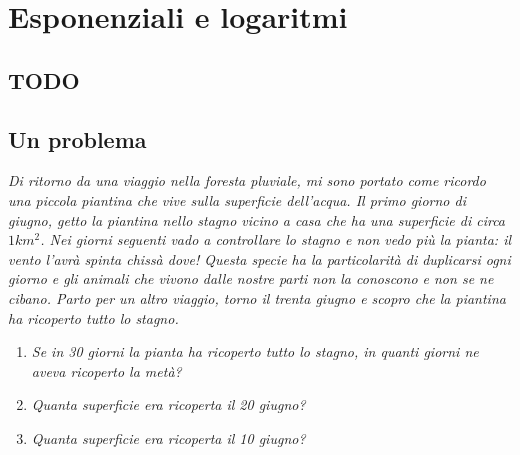 


\chapter[Esponenziali e logaritmi]{Esponenziali e logaritmi}

 

\section{TODO}

\section{Un problema}
\label{sec:esplog_problemi}

\emph{
Di ritorno da una viaggio nella foresta pluviale, mi sono portato come ricordo 
una piccola piantina che vive sulla superficie dell'acqua. 
Il primo giorno di giugno, getto la piantina nello stagno vicino a casa che ha 
una superficie di circa \(1km^2\).
Nei giorni seguenti vado a controllare lo stagno e non vedo più la pianta: il 
vento l'avrà spinta chissà dove! 
Questa specie ha la particolarità di duplicarsi ogni giorno e gli animali che 
vivono dalle nostre parti non la conoscono e non se ne cibano.
Parto per un altro viaggio, torno il trenta giugno e scopro che la piantina 
ha ricoperto tutto lo stagno.}

\begin{enumerate}
 \item
\emph{Se in 30 giorni la pianta ha ricoperto tutto lo stagno, in quanti giorni 
ne aveva ricoperto la metà?}
 \item 
\emph{Quanta superficie era ricoperta il 20 giugno?}
 \item 
\emph{Quanta superficie era ricoperta il 10 giugno?}
\end{enumerate}

